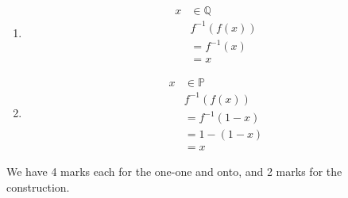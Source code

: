 \documentclass[12pt]{scrartcl}
\begin{document}
\begin{enumerate}
    \item \begin{align*}
        x &\in \mathbb{Q}
        \\ & f^{-1}(f(x)) 
        \\ &= f^{-1}(x) 
        \\ &= x
    \end{align*}
    \item \begin{align*}
        x &\in \mathbb{P}
        \\ & f^{-1}(f(x)) 
        \\ &= f^{-1}(1 - x) 
        \\ &= 1 - (1 - x)
        \\ &= x
    \end{align*}    
\end{enumerate}
We have 4 marks each for the one-one and onto, and 2 marks for the construction.
\end{document}
